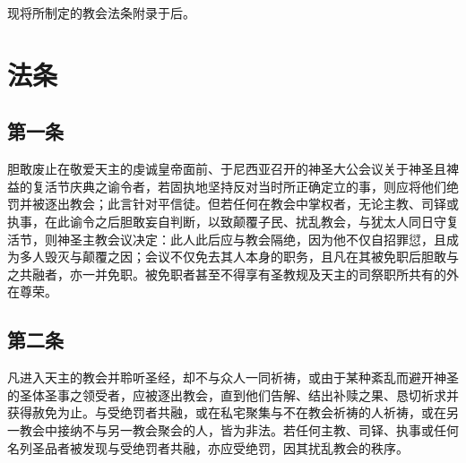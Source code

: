 现将所制定的教会法条附录于后。\par


\section{法条}


\subsection{第一条}

胆敢废止在敬爱天主的虔诚皇帝面前、于尼西亚召开的神圣大公会议关于神圣且裨益的复活节庆典之谕令者，若固执地坚持反对当时所正确定立的事，则应将他们绝罚并被逐出教会；此言针对平信徒。但若任何在教会中掌权者，无论主教、司铎或执事，在此谕令之后胆敢妄自判断，以致颠覆子民、扰乱教会，与犹太人同日守复活节，则神圣主教会议决定：此人此后应与教会隔绝，因为他不仅自招罪愆，且成为多人毁灭与颠覆之因；会议不仅免去其人本身的职务，且凡在其被免职后胆敢与之共融者，亦一并免职。被免职者甚至不得享有圣教规及天主的司祭职所共有的外在尊荣。\par


\subsection{第二条}

凡进入天主的教会并聆听圣经，却不与众人一同祈祷，或由于某种紊乱而避开神圣的圣体圣事之领受者，应被逐出教会，直到他们告解、结出补赎之果、恳切祈求并获得赦免为止。与受绝罚者共融，或在私宅聚集与不在教会祈祷的人祈祷，或在另一教会中接纳不与另一教会聚会的人，皆为非法。若任何主教、司铎、执事或任何名列圣品者被发现与受绝罚者共融，亦应受绝罚，因其扰乱教会的秩序。\par

\par


